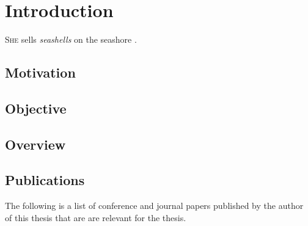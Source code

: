 \chapter{Introduction}
\textsc{She} sells \emph{seashells} on the seashore \cite{goodfellow2016}.

\section{Motivation}
\lipsum[1]

\section{Objective}
\lipsum[1]

\section{Overview}
\lipsum[1]

\section{Publications}
The following is a list of conference and journal papers published by the author
of this thesis that are are relevant for the thesis.

\printbibliography[heading=none,keyword=own]

